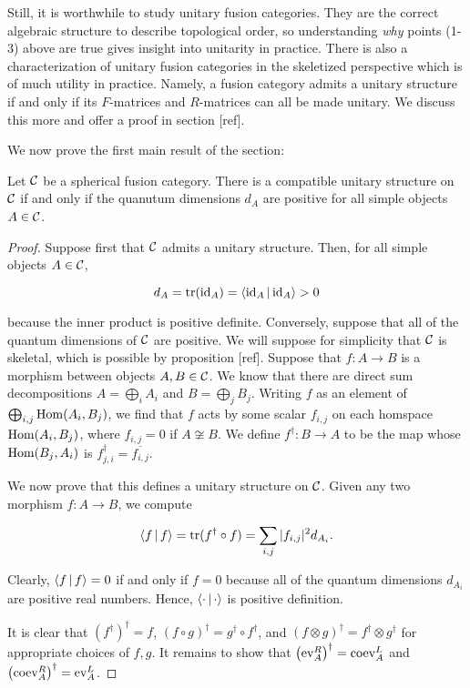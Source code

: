 Still, it is worthwhile to study unitary fusion categories. They are the correct algebraic structure to describe topological order, so understanding {\em why} points (1-3) above are true gives insight into unitarity in practice. There is also a characterization of unitary fusion categories in the skeletized perspective which is of much utility in practice. Namely, a fusion category admits a unitary structure if and only if its $F$-matrices and $R$-matrices can all be made unitary. We discuss this more and offer a proof in section [ref].

We now prove the first main result of the section:

\begin{prop} Let ${\mathcal C}$ be a spherical fusion category. There is a compatible unitary structure on ${\mathcal C}$ if and only if  the quanutum dimensions $d_A$ are positive for all simple objects $A\in {\mathcal C}$. 
\end{prop}
\begin{proof} Suppose first that ${\mathcal C}$ admits a unitary structure. Then, for all simple objects $A\in {\mathcal C}$,

$$d_A=\operatorname{tr}(\operatorname{id}_{A})=\Braket{\operatorname{id}_{A} | \operatorname{id}_{A}}>0$$

because the inner product is positive definite. Conversely, suppose that all of the quantum dimensions of ${\mathcal C}$ are positive. We will suppose for simplicity that ${\mathcal C}$ is skeletal, which is possible by proposition [ref]. Suppose that $f:A\to B$ is a morphism between objects $A,B\in {\mathcal C}$. We know that there are direct sum decompositions $A=\bigoplus_{i}A_i$ and $B=\bigoplus_{j}B_j$. Writing $f$ as an element of $\bigoplus_{i,j}\operatorname{Hom}(A_i,B_j)$, we find that $f$ acts by some scalar $f_{i,j}$ on each homspace $\operatorname{Hom}(A_i,B_j)$, where $f_{i,j}=0$ if $A\not\cong B$. We define $f^{\dagger}: B\to A$ to be the map whose $\operatorname{Hom}(B_j,A_i)$ is $f_{j,i}^{\dagger}=\overline{f_{i,j}}$.

We now prove that this defines a unitary structure on ${\mathcal C}$. Given any two morphism $f:A\to B$, we compute

$$\Braket{f|f}=\operatorname{tr}(f^{\dagger}\circ f)=\sum_{i,j}|f_{i,j}|^2d_{A_i}.$$

Clearly, $\Braket{f|f}=0$ if and only if $f=0$ because all of the quantum dimensions $d_{A_i}$ are positive real numbers. Hence, $\Braket{\cdot|\cdot}$ is positive definition.

It is clear that $(f^{\dagger})^{\dagger}=f$, $(f\circ g)^{\dagger}=g^{\dagger}\circ f^{\dagger}$,  and $(f\otimes g)^{\dagger}=f^{\dagger}\otimes g^{\dagger}$ for appropriate choices of $f,g$. It remains to show that $\left(\operatorname{ev}^R_{A}\right)^{\dagger}=\operatorname{coev}^{L}_A$ and $\left(\operatorname{coev}^{R}_A\right)^{\dagger}=\operatorname{ev}^L_A$.

\end{proof}

